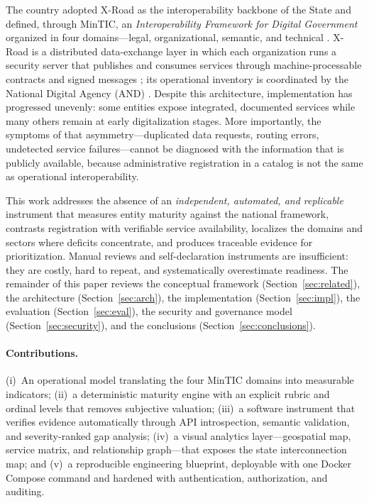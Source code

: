 \documentclass[runningheads]{llncs}
\begin{document}
The country adopted X-Road as the interoperability backbone of the State and
defined, through MinTIC, an \emph{Interoperability Framework for Digital
Government} organized in four domains---legal, organizational, semantic, and
technical \cite{mintic2025}. X-Road is a distributed data-exchange layer in
which each organization runs a security server that publishes and consumes
services through machine-processable contracts and signed messages
\cite{niis2026}; its operational inventory is coordinated by the National
Digital Agency (AND) \cite{and2025}. Despite this architecture,
implementation has progressed unevenly: some entities expose integrated,
documented services while many others remain at early digitalization stages.
More importantly, the symptoms of that asymmetry---duplicated data requests,
routing errors, undetected service failures---cannot be diagnosed with the
information that is publicly available, because administrative registration
in a catalog is not the same as operational interoperability.

This work addresses the absence of an \emph{independent, automated, and
replicable} instrument that measures entity maturity against the national
framework, contrasts registration with verifiable service availability,
localizes the domains and sectors where deficits concentrate, and produces
traceable evidence for prioritization. Manual reviews and self-declaration
instruments are insufficient: they are costly, hard to repeat, and
systematically overestimate readiness. The remainder of this paper reviews
the conceptual framework (Section~\ref{sec:related}), the architecture
(Section~\ref{sec:arch}), the implementation (Section~\ref{sec:impl}), the
evaluation (Section~\ref{sec:eval}), the security and governance model
(Section~\ref{sec:security}), and the conclusions
(Section~\ref{sec:conclusions}).

\paragraph{Contributions.} (i)~An operational model translating the four
MinTIC domains into measurable indicators; (ii)~a deterministic maturity
engine with an explicit rubric and ordinal levels that removes subjective
valuation; (iii)~a software instrument that verifies evidence automatically
through API introspection, semantic validation, and severity-ranked gap
analysis; (iv)~a visual analytics layer---geospatial map, service matrix, and
relationship graph---that exposes the state interconnection map; and (v)~a
reproducible engineering blueprint, deployable with one Docker Compose
command and hardened with authentication, authorization, and auditing.
\end{document}
